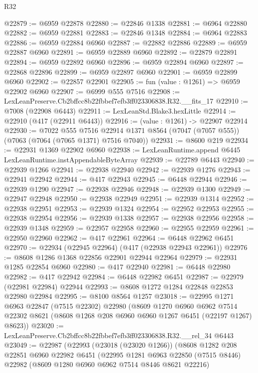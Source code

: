 \begin{lexlean}{R32}
\begin{coremodule}
@22879 := @6959 @22878
@22880 := @22846 @1338
@22881 := @6964 @22880
@22882 := @6959 @22881
@22883 := @22846 @1348
@22884 := @6964 @22883
@22886 := @6959 @22884 @6960
@22887 := @22882 @22886
@22889 := @6959 @22887 @6960
@22891 := @6959 @22889 @6960
@22892 := @22879 @22891
@22894 := @6959 @22892 @6960
@22896 := @6959 @22894 @6960
@22897 := @22868 @22896
@22899 := @6959 @22897 @6960
@22901 := @6959 @22899 @6960
@22902 := @22857 @22901
@22905 := fun (value : @1261) => @6959 @22902 @6960
@22907 := @6999 @555 @7516
@22908 := LexLeanPreserve.Cb2bffcc8b22fbbef7efb3ff023306838.R32.__fits_17
@22910 := @7008 (@22908 @6443)
@22911 := LexLeanStd.Blake3.hexLittle
@22914 := @22910 (@417 (@22911 @6443))
@22916 := (value : @1261) -> @22907 @22914
@22930 := @7022
    @555
    @7516
    @22914
    @1371
    @8564
    (@7047 (@7057 @555))
    (@7063 (@7064 (@7065 @1371) @7516 @7040))
@22931 := @8600 @219
@22934 := @22931 @1369 @22902 @6960
@22938 := LexLeanRuntime.append @6445 LexLeanRuntime.instAppendableByteArray
@22939 := @22789 @6443
@22940 := @22939 @1266
@22941 := @22938 @22940
@22942 := @22939 @1276
@22943 := @22941 @22942
@22944 := @417 @22943
@22945 := @6448 @22944
@22946 := @22939 @1290
@22947 := @22938 @22946
@22948 := @22939 @1300
@22949 := @22947 @22948
@22950 := @22938 @22949
@22951 := @22939 @1314
@22952 := @22938 @22951
@22953 := @22939 @1324
@22954 := @22952 @22953
@22955 := @22938 @22954
@22956 := @22939 @1338
@22957 := @22938 @22956
@22958 := @22939 @1348
@22959 := @22957 @22958
@22960 := @22955 @22959
@22961 := @22950 @22960
@22962 := @417 @22961
@22964 := @6448 @22962 @6451
@22970 := @22934 (@22945 @22964) (@417 (@22938 @22943 @22961))
@22976 := @8608 @1286 @1368 @22856 @22901 @22944 @22964
@22979 := @22931 @1285 @22854 @6960
@22980 := @417 @22940
@22981 := @6448 @22980
@22982 := @417 @22942
@22984 := @6448 @22982 @6451
@22987 := @22979 (@22981 @22984) @22944
@22993 := @8608 @1272 @1284 @22848 @22853 @22980 @22984
@22995 := @8100 @8564 @1257
@23018 := @22995
    @1271
    @6963
    @22847
    (@7515 @22302)
    @22980
    (@8609
      @1270
      @6960
      @6962
      @7514
      @22302
      @8621
      (@8608 @1268 @208 @6960 @6960 @1267 @6451 (@22197 @1267) @8623))
@23020 := LexLeanPreserve.Cb2bffcc8b22fbbef7efb3ff023306838.R32.__rel_34 @6443
@23049 := @22987
    (@22993
      (@23018 (@23020 @1266))
      (@8608
        @1282
        @208
        @22851
        @6960
        @22982
        @6451
        (@22995
          @1281
          @6963
          @22850
          (@7515 @8446)
          @22982
          (@8609 @1280 @6960 @6962 @7514 @8446 @8621 @22216)

\end{coremodule}
\end{lexlean}
